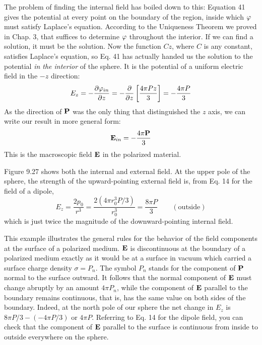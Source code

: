 The problem of finding the internal field has boiled down to this:
Equation 41 gives the potential at every point on the boundary of
the region, inside which $\varphi$ must satisfy Laplace's equation. 
According to the Uniqueness Theorem we proved in Chap. 3, that suffices
to determine $\varphi$ throughout the interior. If we can find a solution,
it must be the solution. Now the function $Cz$, where $C$ is any 
constant, satisfies Laplace's equation, so Eq. 41 has actually handed us
the solution to the potential \emph{in the interior} of the sphere. It is the
potential of a uniform electric field in the  $-z$ direction:
\begin{equation}
  E_z = -\frac{\partial\varphi_{in}}{\partial z}
      = -\frac{\partial}{\partial z}\left[\frac{4\pi Pz}{3}\right]
      = -\frac{4\pi P}{3}
\end{equation}
As the direction of $\mathbf{P}$ was the only thing that distinguished the $z$ axis,
we can write our result in more general form:
\begin{equation}
  \mathbf{E}_{in} = -\frac{4\pi \mathbf{P}}{3}
\end{equation}
This is the macroscopic field $\mathbf{E}$ in the polarized material.

Figure 9.27 shows both the internal and external field. At the
upper pole of the sphere, the strength of the upward-pointing external
field is, from Eq. 14 for the field of a dipole,
\begin{equation}
  E_z = \frac{2p_0}{r^3} = \frac{2(4\pi r_0^3 P/3)}{r_0^3} = \frac{8\pi P}{3} \qquad (\text{outside})
\end{equation}
which is just twice the magnitude of the downward-pointing internal
field.

This example illustrates the general rules for the behavior of the
field components at the surface of a polarized medium. $\mathbf{E}$ is discontinuous
at the boundary of a polarized medium exactly as it
would be at a surface in vacuum which carried a surface charge
density $\sigma=P_n$. The symbol $P_n$ stands for the component of $\mathbf{P}$
normal to the surface outward. It follows that the normal component
of $\mathbf{E}$ must change abruptly by an amount $4\pi P_n$, while the
component of $\mathbf{E}$ parallel to the boundary remains continuous, that
is, has the same value on both sides of the boundary. Indeed, at the
north pole of our sphere the net change in $E_z$ is $8\pi P/3-(-4\pi P/3)$
or $4\pi P$. Referring to Eq. 14 for the dipole field, you can check that
the component of $\mathbf{E}$ parallel to the surface is continuous from inside
to outside everywhere on the sphere.

